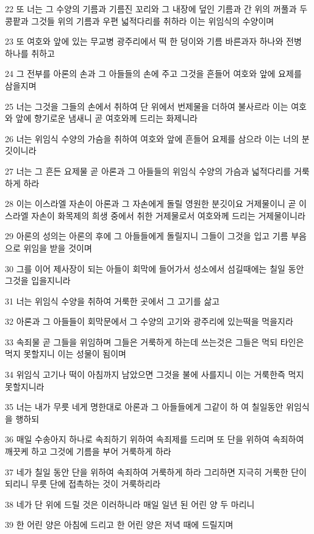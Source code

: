 \par 22 또 너는 그 수양의 기름과 기름진 꼬리와 그 내장에 덮인 기름과 간 위의 꺼풀과 두 콩팥과 그것들 위의 기름과 우편 넓적다리를 취하라 이는 위임식의 수양이며
\par 23 또 여호와 앞에 있는 무교병 광주리에서 떡 한 덩이와 기름 바른과자 하나와 전병 하나를 취하고
\par 24 그 전부를 아론의 손과 그 아들들의 손에 주고 그것을 흔들어 여호와 앞에 요제를 삼을지며
\par 25 너는 그것을 그들의 손에서 취하여 단 위에서 번제물을 더하여 불사르라 이는 여호와 앞에 향기로운 냄새니 곧 여호와께 드리는 화제니라
\par 26 너는 위임식 수양의 가슴을 취하여 여호와 앞에 흔들어 요제를 삼으라 이는 너의 분깃이니라
\par 27 너는 그 흔든 요제물 곧 아론과 그 아들들의 위임식 수양의 가슴과 넓적다리를 거룩하게 하라
\par 28 이는 이스라엘 자손이 아론과 그 자손에게 돌릴 영원한 분깃이요 거제물이니 곧 이스라엘 자손이 화목제의 희생 중에서 취한 거제물로서 여호와께 드리는 거제물이니라
\par 29 아론의 성의는 아론의 후에 그 아들들에게 돌릴지니 그들이 그것을 입고 기름 부음으로 위임을 받을 것이며
\par 30 그를 이어 제사장이 되는 아들이 회막에 들어가서 성소에서 섬길때에는 칠일 동안 그것을 입을지니라
\par 31 너는 위임식 수양을 취하여 거룩한 곳에서 그 고기를 삶고
\par 32 아론과 그 아들들이 회막문에서 그 수양의 고기와 광주리에 있는떡을 먹을지라
\par 33 속죄물 곧 그들을 위임하며 그들은 거룩하게 하는데 쓰는것은 그들은 먹되 타인은 먹지 못할지니 이는 성물이 됨이며
\par 34 위임식 고기나 떡이 아침까지 남았으면 그것을 불에 사를지니 이는 거룩한즉 먹지 못할지니라
\par 35 너는 내가 무릇 네게 명한대로 아론과 그 아들들에게 그같이 하 여 칠일동안 위임식을 행하되
\par 36 매일 수송아지 하나로 속죄하기 위하여 속죄제를 드리며 또 단을 위하여 속죄하여 깨끗케 하고 그것에 기름을 부어 거룩하게 하라
\par 37 네가 칠일 동안 단을 위하여 속죄하여 거룩하게 하라 그리하면 지극히 거룩한 단이 되리니 무릇 단에 접촉하는 것이 거룩하리라
\par 38 네가 단 위에 드릴 것은 이러하니라 매일 일년 된 어린 양 두 마리니
\par 39 한 어린 양은 아침에 드리고 한 어린 양은 저녁 때에 드릴지며

